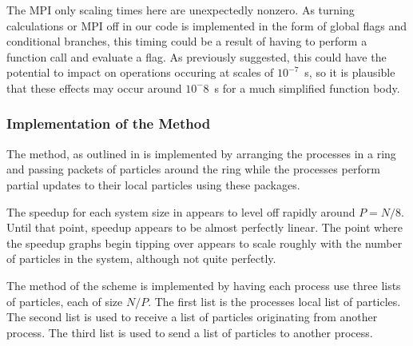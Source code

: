The MPI only scaling times here are unexpectedly nonzero.
%
As turning calculations or MPI off in our code is implemented in
the form of global flags and conditional branches, this timing
could be a result of having to perform a function call and
evaluate a flag.
%
As previously suggested, this could have the potential to impact on
operations occuring at scales of $10^{-7}$~s, so it is plausible
that these effects may occur around $10^-{8}$~s for a much simplified
function body.


%
%

\subsubsection{Implementation of the \pairoperation{} Method}

The \pairoperation{} method, as outlined in 
is implemented by arranging the processes in a ring and passing
packets of particles around the ring while the processes perform
partial updates to their local particles using these packages.


%

%
%
\begin{figure}[!h]
    
    \caption{
        \vZeroSpeedupCaption
            {\systolicloop{}}
            {\pairoperation{}}
    }
    \label{fig:v0_systolic_pair_operation_speedups}
\end{figure}


\vZeroSpeedupExplanation
    {}
    {\systolicloop{}}
    {\pairoperation{}}

The speedup for each system size in 
appears to level off rapidly around $P = N/8$.
%
Until that point, speedup appears to be almost perfectly linear.
%
The point where the speedup graphs begin tipping over appears to
scale roughly with the number of particles in the system,
although not quite perfectly.


The \pairoperation{} method of the \systolicloop{} scheme is
implemented by having each process use three lists of particles,
each of size $N/P$.
%
The first list is the processes local list of particles.
%
The second list is used to receive a list of particles originating from
another process.
%
The third list is used to send a list of particles to another process.

